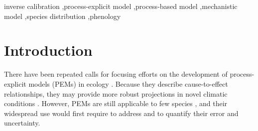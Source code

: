 \documentclass[preprint,12pt,authoryear]{elsarticle}
\begin{document}
\begin{frontmatter}


\begin{keyword}
inverse calibration \sep process-explicit model \sep process-based model \sep mechanistic model \sep species distribution \sep phenology
\end{keyword}

\end{frontmatter}

\linenumbers

\clearpage
\section{Introduction}

There have been repeated calls for focusing efforts on the development of process-explicit models (PEMs) in ecology \citep{Urban2016, Singer2016, Pilowsky2022}. Because they describe cause-to-effect relationships, they may provide more robust projections in novel climatic conditions \citep{VanderMeersch2025}. However, PEMs are still applicable to few species \citep{Evans2016}, and their widespread use would first require to address and to quantify their error and uncertainty.
\end{document}
